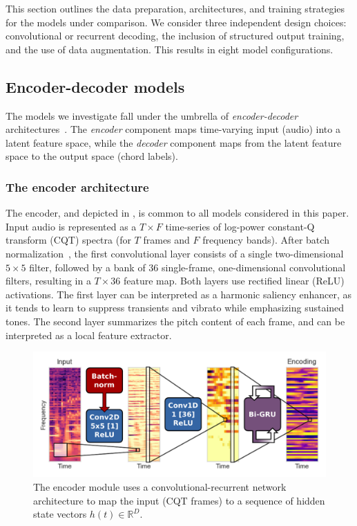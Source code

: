\documentclass{article}
\begin{document}

This section outlines the data preparation, architectures, and training strategies for the models under comparison.
We consider three independent design choices: convolutional or recurrent decoding, the inclusion of structured output training, and the use of data augmentation.
This results in eight model configurations.

\subsection{Encoder-decoder models}

The models we investigate fall under the umbrella of \emph{encoder-decoder} architectures~\cite{cho2015describing}.
The \emph{encoder} component maps time-varying input (audio) into a latent feature space, while the \emph{decoder} component maps from the latent feature space to the output space (chord labels).

\subsubsection{The encoder architecture}
The encoder, and depicted in , is common to all models considered in this paper.
Input audio is represented as a $T\times F$ time-series of log-power constant-Q transform (CQT) spectra (for $T$ frames and $F$ frequency bands).
After batch normalization~\cite{ioffe2015batch}, the first convolutional layer consists of a single two-dimensional $5\times5$ filter, followed by a bank of $36$ single-frame, one-dimensional convolutional filters, resulting in a $T\times 36$ feature map.
Both layers use rectified linear (ReLU) activations.
The first layer can be interpreted as a harmonic saliency enhancer, as it tends to learn to suppress transients and vibrato while emphasizing sustained tones.
The second layer summarizes the pitch content of each frame, and can be interpreted as a local feature extractor.

\begin{figure}[t]
    \centering
    \includegraphics[width=\columnwidth]{encoder-r}
    \caption{The encoder module uses a convolutional-recurrent network architecture to map the input (CQT frames) to a sequence of hidden state vectors $h(t) \in \mathbb{R}^D$.\label{fig:encoder}}
\end{figure}
\end{document}
